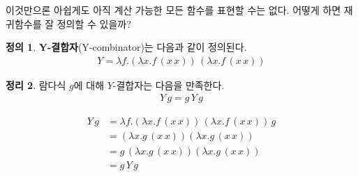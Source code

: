 \documentclass[b5paper, 10pt]{book}
\theoremstyle{definition}
\newtheorem{defn}{정의}[chapter]
\newtheorem{thm}[defn]{정리}
\newenvironment{pf*}{\pushQED{\qed}\pf}{\popQED\endpf}
\begin{document}
이것만으론 아쉽게도 아직 계산 가능한 모든 함수를 표현할 수는 없다. 어떻게 하면 재귀함수를 잘 정의할
수 있을까? 
\begin{defn}
    \textbf{Y-결합자}(Y-combinator)는 다음과 같이 정의된다.
    \begin{align*}
        Y = \lambda f.(\lambda x. f \, (x\, x)) \, (\lambda x. f \, (x \, x))
    \end{align*}
\end{defn}
\begin{thm}
    람다식 $g$에 대해 $Y$-결합자는 다음을 만족한다.
    \begin{align*}
        Y \, g = g \, Y \, g
    \end{align*}
\end{thm}
\begin{pf*}
    \begin{align*}
        Y \, g &= \lambda f.(\lambda x. f \, (x\, x)) \, (\lambda x. f \, (x \, x)) \, g \\
        &= (\lambda x. g \, (x \, x)) (\lambda x .g \, (x \, x)) \\ 
        &= g \,  (\lambda x. g \, (x \, x)) (\lambda x .g \, (x \, x))  \\ 
        &= g \, Y \, g
    \end{align*}
\end{pf*}
\end{document}
